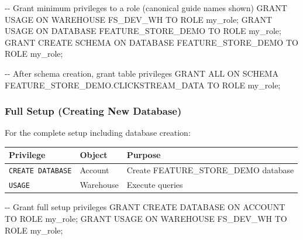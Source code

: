 \documentclass[
  letterpaper,
  DIV=11,
  numbers=noendperiod]{scrreprt}
\newenvironment{Shaded}{\begin{snugshade}}{\end{snugshade}}
\newcommand{\CommentTok}[1]{\textcolor[rgb]{0.37,0.37,0.37}{#1}}
\newcommand{\KeywordTok}[1]{\textcolor[rgb]{0.00,0.23,0.31}{#1}}
\newcommand{\NormalTok}[1]{\textcolor[rgb]{0.00,0.23,0.31}{#1}}
\begin{document}
\begin{Shaded}
\begin{Highlighting}[]
\CommentTok{{-}{-} Grant minimum privileges to a role (canonical guide names shown)}
\KeywordTok{GRANT} \KeywordTok{USAGE} \KeywordTok{ON}\NormalTok{ WAREHOUSE FS\_DEV\_WH }\KeywordTok{TO} \KeywordTok{ROLE}\NormalTok{ my\_role;}
\KeywordTok{GRANT} \KeywordTok{USAGE} \KeywordTok{ON} \KeywordTok{DATABASE}\NormalTok{ FEATURE\_STORE\_DEMO }\KeywordTok{TO} \KeywordTok{ROLE}\NormalTok{ my\_role;}
\KeywordTok{GRANT} \KeywordTok{CREATE} \KeywordTok{SCHEMA} \KeywordTok{ON} \KeywordTok{DATABASE}\NormalTok{ FEATURE\_STORE\_DEMO }\KeywordTok{TO} \KeywordTok{ROLE}\NormalTok{ my\_role;}

\CommentTok{{-}{-} After schema creation, grant table privileges}
\KeywordTok{GRANT} \KeywordTok{ALL} \KeywordTok{ON} \KeywordTok{SCHEMA}\NormalTok{ FEATURE\_STORE\_DEMO.CLICKSTREAM\_DATA }\KeywordTok{TO} \KeywordTok{ROLE}\NormalTok{ my\_role;}
\end{Highlighting}
\end{Shaded}

\hypertarget{full-setup-creating-new-database}{%
\subsubsection{Full Setup (Creating New
Database)}\label{full-setup-creating-new-database}}

For the complete setup including database creation:

\begin{longtable}[]{@{}lll@{}}
\toprule\noalign{}
Privilege & Object & Purpose \\
\midrule\noalign{}
\endhead
\bottomrule\noalign{}
\endlastfoot
\texttt{CREATE\ DATABASE} & Account & Create FEATURE\_STORE\_DEMO
database \\
\texttt{USAGE} & Warehouse & Execute queries \\
\end{longtable}

\begin{Shaded}
\begin{Highlighting}[]
\CommentTok{{-}{-} Grant full setup privileges}
\KeywordTok{GRANT} \KeywordTok{CREATE} \KeywordTok{DATABASE} \KeywordTok{ON} \KeywordTok{ACCOUNT} \KeywordTok{TO} \KeywordTok{ROLE}\NormalTok{ my\_role;}
\KeywordTok{GRANT} \KeywordTok{USAGE} \KeywordTok{ON}\NormalTok{ WAREHOUSE FS\_DEV\_WH }\KeywordTok{TO} \KeywordTok{ROLE}\NormalTok{ my\_role;}
\end{Highlighting}
\end{Shaded}
\end{document}
